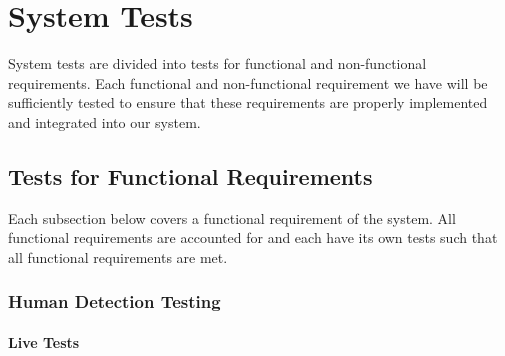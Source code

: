 \documentclass[12pt, titlepage]{article}
\begin{document}
\section{System Tests}

System tests are divided into tests for functional and non-functional requirements. Each functional and non-functional requirement we have will be sufficiently tested to ensure that these requirements are properly implemented and integrated into our system.

\subsection{Tests for Functional Requirements}

Each subsection below covers a functional requirement of the system. All functional requirements are accounted for and each have its own tests such that all functional requirements are met. 

\subsubsection{Human Detection Testing}
		
\paragraph{Live Tests}
\end{document}
